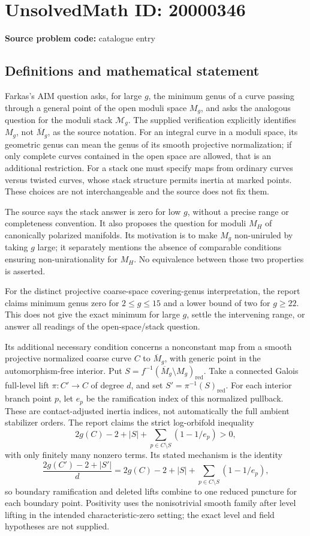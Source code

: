 \documentclass[11pt]{article}
\begin{document}
\section*{UnsolvedMath ID: 20000346}
\textbf{Source problem code:} catalogue entry
\subsection{Definitions and mathematical statement}
Farkas's AIM question asks, for large $g$, the minimum genus of a curve passing through a general point of the open moduli space $M_g$, and asks the analogous question for the moduli stack $\mathcal M_g$. The supplied verification explicitly identifies $M_g$, not $\overline M_g$, as the source notation. For an integral curve in a moduli space, its geometric genus can mean the genus of its smooth projective normalization; if only complete curves contained in the open space are allowed, that is an additional restriction. For a stack one must specify maps from ordinary curves versus twisted curves, whose stack structure permits inertia at marked points. These choices are not interchangeable and the source does not fix them.

The source says the stack answer is zero for low $g$, without a precise range or completeness convention. It also proposes the question for moduli $M_H$ of canonically polarized manifolds. Its motivation is to make $M_g$ non-uniruled by taking $g$ large; it separately mentions the absence of comparable conditions ensuring non-unirationality for $M_H$. No equivalence between those two properties is asserted.

For the distinct projective coarse-space covering-genus interpretation, the report claims minimum genus zero for $2\leq g\leq15$ and a lower bound of two for $g\geq22$. This does not give the exact minimum for large $g$, settle the intervening range, or answer all readings of the open-space/stack question.

Its additional necessary condition concerns a nonconstant map from a smooth projective normalized coarse curve $C$ to $\overline M_g$, with generic point in the automorphism-free interior. Put $S=f^{-1}(\overline M_g\setminus M_g)_{\mathrm{red}}$. Take a connected Galois full-level lift $\pi:C'\to C$ of degree $d$, and set $S'=\pi^{-1}(S)_{\mathrm{red}}$. For each interior branch point $p$, let $e_p$ be the ramification index of this normalized pullback. These are contact-adjusted inertia indices, not automatically the full ambient stabilizer orders. The report claims the strict log-orbifold inequality
\[
 2g(C)-2+|S|+\sum_{p\in C\setminus S}(1-1/e_p)>0,
\]
with only finitely many nonzero terms. Its stated mechanism is the identity
\[
 \frac{2g(C')-2+|S'|}{d}
 =2g(C)-2+|S|+\sum_{p\in C\setminus S}(1-1/e_p),
\]
so boundary ramification and deleted lifts combine to one reduced puncture for each boundary point. Positivity uses the nonisotrivial smooth family after level lifting in the intended characteristic-zero setting; the exact level and field hypotheses are not supplied.
\end{document}
